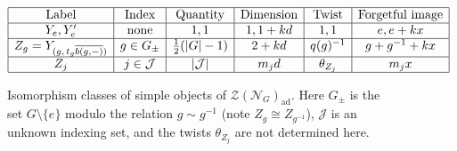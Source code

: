 \documentclass[10pt]{article}
\theoremstyle{plain}
\theoremstyle{definition}
\theoremstyle{plain}
\begin{document}
\begin{figure}[H]
    \centering
    \begin{equation*}
        \begin{array}{|c|c|c|c|c|c|}\hline
            \text{Label} & \text{Index} & \text{Quantity} & \text{Dimension} & \text{Twist} & \text{Forgetful image}  \\\hline
            Y_e,Y_e' & \text{none} & 1,1 & 1,1+kd & 1,1 & e,e+kx \\\hline
            Z_g=Y_{(g,\,t_g\overline{b(g,-)})} & g\in G_{\pm} & \frac{1}{2}(|G|-1) & 2+kd & q(g)^{-1} & g+g^{-1}+kx  \\\hline
            Z_j & j\in\mathcal{J} & |\mathcal{J}| & m_jd & \theta_{Z_j} & m_jx  \\\hline
        \end{array}
    \end{equation*}
    \caption{Isomorphism classes of simple objects of $\mathcal{Z}(\mathcal{N}_G)_\mathrm{ad}$. Here $G_{\pm}$ is the set $G\setminus\{e\}$ modulo the relation $g\sim g^{-1}$ (note $Z_g\cong Z_{g^{-1}}$), $\mathcal{J}$ is an unknown indexing set, and the twists $\theta_{Z_j}$ are not determined here.}
    \label{fig:simples}
\end{figure}
\end{document}
